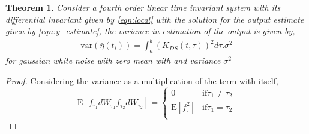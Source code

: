 \documentclass[letterpaper%
, twoside%
, 12pt%
,memoire%
, english%
,creativecommons,hyperref%
]{thETS}
\theoremstyle{newThmStyle}
\newtheorem{theorem}{Theorem}
\begin{document}
\begin{theorem}
Consider a fourth order linear time invariant system with its differential invariant given by \eqref{eqn:local} with the solution for the output estimate given by \eqref{eqn:y_estimate}, the variance in estimation of the output is given by, 
\begin{align*}
\text{var}(\bar{\eta}(t_i)) = \int_a^b \left(K_{DS}(t,\tau)\right)^2 d\tau . \sigma^2
\end{align*}
for gaussian white noise with zero mean with and variance $\sigma^2$
\end{theorem}
\begin{proof}
Considering the variance as a multiplication of the term with itself, 
\[ \text{E}[f_{\tau_1}dW_{\tau_1} f_{\tau_2}dW_{\tau_2}] = 
   \begin{cases} 
      0 & \text{if} \tau_1 \neq \tau_2  \\
      \text{E}[ f_\tau^2] & \text{if} \tau_1 = \tau_2 \\
       

\end{cases}\]
\end{proof}
\end{document}
